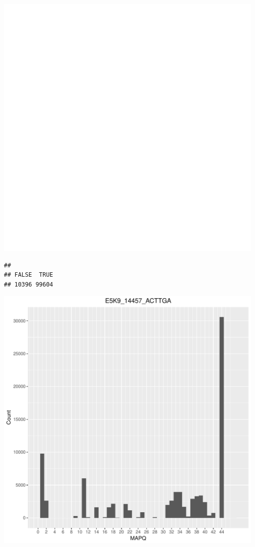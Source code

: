 \documentclass[12pt, a4paper]{article}\usepackage[]{graphicx}\usepackage[]{color}
\makeatletter
\def\maxwidth{ %
  \ifdim\Gin@nat@width>\linewidth
    \linewidth
  \else
    \Gin@nat@width
  \fi
}
\newenvironment{kframe}{%
 \def\at@end@of@kframe{}%
 \ifinner\ifhmode%
  \def\at@end@of@kframe{\end{minipage}}%
  \begin{minipage}{\columnwidth}%
 \fi\fi%
 \def\FrameCommand##1{\hskip\@totalleftmargin \hskip-\fboxsep
 \colorbox{shadecolor}{##1}\hskip-\fboxsep
     \hskip-\linewidth \hskip-\@totalleftmargin \hskip\columnwidth}%
 \MakeFramed {\advance\hsize-\width
   \@totalleftmargin\z@ \linewidth\hsize
   \@setminipage}}%
 {\par\unskip\endMakeFramed%
 \at@end@of@kframe}
\newenvironment{knitrout}{}{} %
\makeatother
\begin{document}
\begin{knitrout}
\includegraphics[width=\maxwidth]{figure/unnamed-chunk-3-14} 
\begin{kframe}\begin{verbatim}
## 
## FALSE  TRUE 
## 10396 99604
\end{verbatim}
\end{kframe}
\includegraphics[width=\maxwidth]{figure/unnamed-chunk-3-15} 


\end{knitrout}
\end{document}
